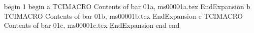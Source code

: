 begin
1
begin
a
TCIMACRO
Contents of bar 01a, ms00001a.tex
EndExpansion
b
TCIMACRO
Contents of bar 01b, ms00001b.tex
EndExpansion
c
TCIMACRO
Contents of bar 01c, ms00001c.tex
EndExpansion
end
end
